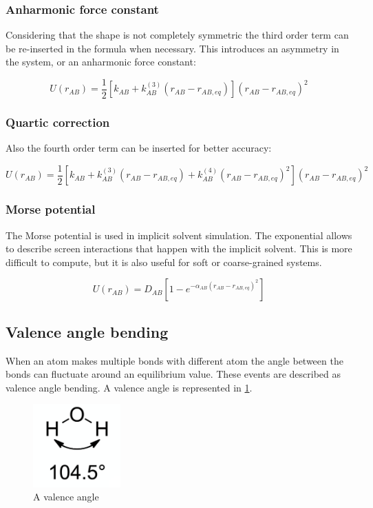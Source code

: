 		\subsubsection{Anharmonic force constant}
		Considering that the shape is not completely symmetric the third order term can be re-inserted in the formula when necessary.
		This introduces an asymmetry in the system, or an anharmonic force constant:

		$$U(r_{AB}) = \frac{1}{2}[k_{AB}+k^{(3)}_{AB}(r_{AB}-r_{AB, eq})](r_{AB}-r_{AB, eq})^2$$

		\subsubsection{Quartic correction}
		Also the fourth order term can be inserted for better accuracy:

		$$U(r_{AB}) = \frac{1}{2}[k_{AB}+k^{(3)}_{AB}(r_{AB}-r_{AB, eq}) + k^{(4)}_{AB}(r_{AB}-r_{AB,eq})^2](r_{AB}-r_{AB, eq})^2$$

		\subsubsection{Morse potential}
		The Morse potential is used in implicit solvent simulation.
		The exponential allows to describe screen interactions that happen with the implicit solvent.
		This is more difficult to compute, but it is also useful for soft or coarse-grained systems.

		$$U(r_{AB}) = D_{AB}\left[1-e^{-\alpha_{AB}(r_{AB}-r_{AB,eq})^2}\right]$$

	\subsection{Valence angle bending}
	When an atom makes multiple bonds with different atom the angle between the bonds can fluctuate around an equilibrium value.
	These events are described as valence angle bending.
	A valence angle is represented in \ref{fig:valence-angle-bending}.

	\begin{figure}[H]
		\centering
		\includegraphics[width=0.3\textwidth]{valence-angle-bending}
		\caption{A valence angle}
		\label{fig:valence-angle-bending}
	\end{figure}

